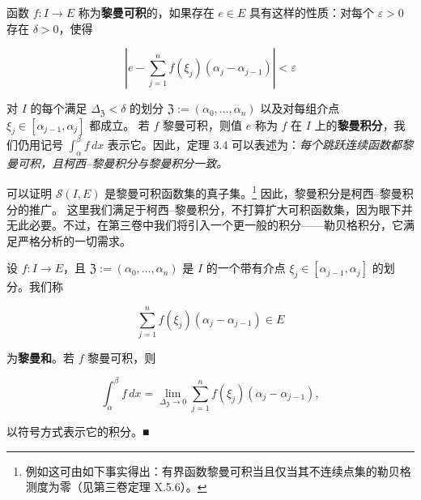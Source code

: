 \begin{remark}

\begin{items}
\item

函数 $ f : I \to E $ 称为\textbf{黎曼可积}的，如果存在 $ e \in E $ 具有这样的性质：对每个 $ \varepsilon > 0 $ 存在 $ \delta > 0 $，使得

\[
\left| e - \sum_{j=1}^{n} f(\xi_j)(\alpha_j - \alpha_{j-1}) \right| < \varepsilon
\]

对 $ I $ 的每个满足 $ \Delta_{\mathfrak{Z}} < \delta $ 的划分 $ \mathfrak{Z} := (\alpha_0, \ldots, \alpha_n) $ 以及对每组介点 $ \xi_j \in [\alpha_{j-1}, \alpha_j] $ 都成立。
若 $ f $ 黎曼可积，则值 $ e $ 称为 $ f $ 在 $ I $ 上的\textbf{黎曼积分}，我们仍用记号 $ \int_{\alpha}^{\beta} f \, dx $ 表示它。因此，定理 3.4 可以表述为：\emph{每个跳跃连续函数都黎曼可积，且柯西–黎曼积分与黎曼积分一致。}

\item

可以证明 $ \mathcal{S}(I, E) $ 是黎曼可积函数集的真子集。\footnote{例如这可由如下事实得出：有界函数黎曼可积当且仅当其不连续点集的勒贝格测度为零（见第三卷定理 X.5.6）。} 因此，黎曼积分是柯西–黎曼积分的推广。
这里我们满足于柯西–黎曼积分，不打算扩大可积函数集，因为眼下并无此必要。不过，在第三卷中我们将引入一个更一般的积分——勒贝格积分，它满足严格分析的一切需求。

\item

设 $ f : I \to E $，且 $ \mathfrak{Z} := (\alpha_0, \ldots, \alpha_n) $ 是 $ I $ 的一个带有介点 $ \xi_j \in [\alpha_{j-1}, \alpha_j] $ 的划分。我们称

\[
\sum_{j=1}^{n} f(\xi_j)(\alpha_j - \alpha_{j-1}) \in E
\]

为\textbf{黎曼和}。若 $ f $ 黎曼可积，则

\[
\int_{\alpha}^{\beta} f \, dx = \lim_{\Delta_{\mathfrak{Z}} \to 0} \sum_{j=1}^{n} f(\xi_j)(\alpha_j - \alpha_{j-1}) ,
\]

以符号方式表示它的积分。\nobreak\hspace{0.35em}■

\end{items}

\end{remark}

\exerciseshead

